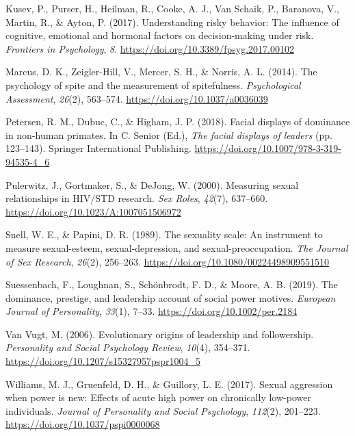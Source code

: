 \documentclass[
  english,
  a4paper]{apa7}
\newlength{\cslhangindent}
\newlength{\cslentryspacingunit} %
\newenvironment{CSLReferences}[2] %
 {%
  \setlength{\parindent}{0pt}
  \ifodd #1
  \let\oldpar\par
  \def\par{\hangindent=\cslhangindent\oldpar}
  \fi
  \setlength{\parskip}{#2\cslentryspacingunit}
 }%
 {}
\begin{document}
\begin{CSLReferences}{1}{0}
\leavevmode{}%
Kusev, P., Purser, H., Heilman, R., Cooke, A. J., Van Schaik, P., Baranova, V., Martin, R., \& Ayton, P. (2017). Understanding risky behavior: The influence of cognitive, emotional and hormonal factors on decision-making under risk. \emph{Frontiers in Psychology}, \emph{8}. \url{https://doi.org/10.3389/fpsyg.2017.00102}

\leavevmode{}%
Marcus, D. K., Zeigler-Hill, V., Mercer, S. H., \& Norris, A. L. (2014). The psychology of spite and the measurement of spitefulness. \emph{Psychological Assessment}, \emph{26}(2), 563--574. \url{https://doi.org/10.1037/a0036039}

\leavevmode{}%
Petersen, R. M., Dubuc, C., \& Higham, J. P. (2018). Facial displays of dominance in non-human primates. In C. Senior (Ed.), \emph{The facial displays of leaders} (pp. 123--143). Springer International Publishing. \url{https://doi.org/10.1007/978-3-319-94535-4_6}

\leavevmode{}%
Pulerwitz, J., Gortmaker, S., \& DeJong, W. (2000). Measuring sexual relationships in {HIV}/{STD} research. \emph{Sex Roles}, \emph{42}(7), 637--660. \url{https://doi.org/10.1023/A:1007051506972}

\leavevmode{}%
Snell, W. E., \& Papini, D. R. (1989). The sexuality scale: An instrument to measure sexual-esteem, sexual-depression, and sexual-preoccupation. \emph{The Journal of Sex Research}, \emph{26}(2), 256--263. \url{https://doi.org/10.1080/00224498909551510}

\leavevmode{}%
Suessenbach, F., Loughnan, S., Schönbrodt, F. D., \& Moore, A. B. (2019). The dominance, prestige, and leadership account of social power motives. \emph{European Journal of Personality}, \emph{33}(1), 7--33. \url{https://doi.org/10.1002/per.2184}

\leavevmode{}%
Van Vugt, M. (2006). Evolutionary origins of leadership and followership. \emph{Personality and Social Psychology Review}, \emph{10}(4), 354--371. \url{https://doi.org/10.1207/s15327957pspr1004_5}

\leavevmode{}%
Williams, M. J., Gruenfeld, D. H., \& Guillory, L. E. (2017). Sexual aggression when power is new: Effects of acute high power on chronically low-power individuals. \emph{Journal of Personality and Social Psychology}, \emph{112}(2), 201--223. \url{https://doi.org/10.1037/pspi0000068}


\end{CSLReferences}
\end{document}
